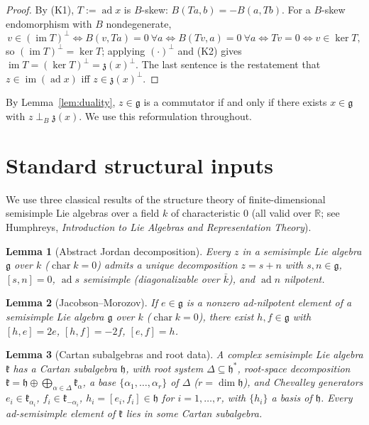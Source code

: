 \documentclass{amsart}
\newtheorem{lemma}{Lemma}
\theoremstyle{definition}
\begin{document}
\begin{proof}
By (K1), $T:=\operatorname{ad}x$ is $B$-skew:
$B(Ta,b)=-B(a,Tb)$. For a $B$-skew endomorphism with $B$ nondegenerate,
\[
  v\in(\operatorname{im}T)^{\perp}
  \iff B(v,Ta)=0\ \forall a
  \iff B(Tv,a)=0\ \forall a
  \iff Tv=0
  \iff v\in\ker T,
\]
so $(\operatorname{im}T)^{\perp}=\ker T$; applying $(\cdot)^{\perp}$ and (K2)
gives $\operatorname{im}T=(\ker T)^{\perp}=\mathfrak z(x)^{\perp}$. The last
sentence is the restatement that $z\in\operatorname{im}(\operatorname{ad}x)$
iff $z\in\mathfrak z(x)^{\perp}$.
\end{proof}

By Lemma~\ref{lem:duality}, $z\in\mathfrak g$ is a commutator if and only if
there exists $x\in\mathfrak g$ with $z\perp_{B}\mathfrak z(x)$. We use this
reformulation throughout.

\section{Standard structural inputs}

We use three classical results of the structure theory of finite-dimensional
semisimple Lie algebras over a field $k$ of characteristic $0$ (all valid over
$\mathbb R$; see Humphreys, \emph{Introduction to Lie Algebras and Representation
Theory}).

\begin{lemma}[Abstract Jordan decomposition]\label{lem:jordan}
Every $z$ in a semisimple Lie algebra $\mathfrak g$ over $k$ ($\operatorname{char}k=0$)
admits a unique decomposition $z=s+n$ with $s,n\in\mathfrak g$, $[s,n]=0$,
$\operatorname{ad}s$ semisimple (diagonalizable over $\bar k$), and
$\operatorname{ad}n$ nilpotent.
\end{lemma}

\begin{lemma}[Jacobson--Morozov]\label{lem:jm}
If $e\in\mathfrak g$ is a nonzero ad-nilpotent element of a semisimple Lie
algebra $\mathfrak g$ over $k$ ($\operatorname{char}k=0$), there exist
$h,f\in\mathfrak g$ with $[h,e]=2e$, $[h,f]=-2f$, $[e,f]=h$.
\end{lemma}

\begin{lemma}[Cartan subalgebras and root data]\label{lem:cartan}
A complex semisimple Lie algebra $\mathfrak k$ has a Cartan subalgebra
$\mathfrak h$, with root system $\Delta\subseteq\mathfrak h^{*}$, root-space
decomposition $\mathfrak k=\mathfrak h\oplus\bigoplus_{\alpha\in\Delta}\mathfrak k_{\alpha}$,
a base $\{\alpha_1,\dots,\alpha_r\}$ of $\Delta$ ($r=\dim\mathfrak h$), and
Chevalley generators $e_i\in\mathfrak k_{\alpha_i}$, $f_i\in\mathfrak k_{-\alpha_i}$,
$h_i=[e_i,f_i]\in\mathfrak h$ for $i=1,\dots,r$, with $\{h_i\}$ a basis of
$\mathfrak h$. Every ad-semisimple element of $\mathfrak k$ lies in some Cartan
subalgebra.
\end{lemma}
\end{document}
